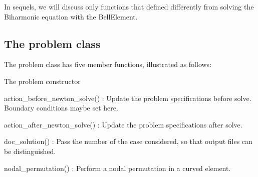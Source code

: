In sequels, we will discuss only functions that defined differently from solving the Biharmonic equation with the {\ttfamily Bell\+Element}.



\hypertarget{index_problem}{}\subsection{The problem class}\label{index_problem}
The problem class has five member functions, illustrated as follows\+:


\begin{DoxyItemize}
\item The problem constructor
\item {\ttfamily action\+\_\+before\+\_\+newton\+\_\+solve()} \+: Update the problem specifications before solve. Boundary conditions maybe set here.
\item {\ttfamily action\+\_\+after\+\_\+newton\+\_\+solve()} \+: Update the problem specifications after solve.
\item {\ttfamily doc\+\_\+solution()} \+: Pass the number of the case considered, so that output files can be distinguished.
\item {\ttfamily nodal\+\_\+permutation()} \+: Perform a nodal permutation in a curved element.
\end{DoxyItemize} 
